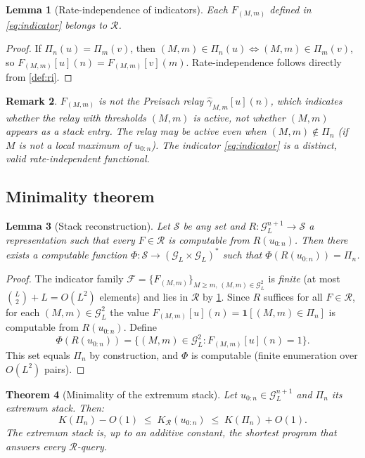 \documentclass[preprint,12pt]{elsarticle}
\newtheorem{theorem}{Theorem}
\newtheorem{lemma}[theorem]{Lemma}
\newtheorem{remark}[theorem]{Remark}
\newcommand{\R}{\mathcal{R}}
\newcommand{\stack}{\Pi}
\newcommand{\GL}{\mathcal{G}_L}
\newcommand{\relay}[2]{\hat{\gamma}_{#1,#2}}
\begin{document}
\begin{lemma}[Rate-independence of indicators]
\label{lem:ri}
Each $F_{(M,m)}$ defined in \eqref{eq:indicator} belongs to $\R$.
\end{lemma}

\begin{proof}
If $\stack_n(u) = \stack_m(v)$, then
$(M,m) \in \stack_n(u) \Leftrightarrow (M,m) \in \stack_m(v)$,
so $F_{(M,m)}[u](n) = F_{(M,m)}[v](m)$.
Rate-independence follows directly from \cref{def:ri}.
\end{proof}

\begin{remark}
$F_{(M,m)}$ is \emph{not} the Preisach relay
$\relay{M}{m}[u](n)$, which indicates whether the relay with
thresholds $(M,m)$ is active, not whether $(M,m)$ appears as a
stack entry.
The relay may be active even when $(M,m) \notin \stack_n$
(if $M$ is not a local maximum of $u_{0:n}$).
The indicator \eqref{eq:indicator} is a distinct, valid
rate-independent functional.
\end{remark}

\subsection{Minimality theorem}

\begin{lemma}[Stack reconstruction]
\label{lem:recon}
Let $\mathcal{S}$ be any set and
$R: \GL^{n+1} \to \mathcal{S}$ a representation such that
every $F \in \R$ is computable from $R(u_{0:n})$.
Then there exists a computable function
$\Phi: \mathcal{S} \to (\GL \times \GL)^*$
such that $\Phi(R(u_{0:n})) = \stack_n$.
\end{lemma}

\begin{proof}
The indicator family $\mathcal{F} = \{F_{(M,m)}\}_{M \geq m,\,
(M,m) \in \GL^2}$ is \emph{finite} (at most
$\binom{L}{2} + L = O(L^2)$ elements) and lies in $\R$
by \cref{lem:ri}.
Since $R$ suffices for all $F \in \R$, for each
$(M,m) \in \GL^2$ the value $F_{(M,m)}[u](n)
= \mathbf{1}[(M,m) \in \stack_n]$ is computable from
$R(u_{0:n})$.
Define
\[
  \Phi(R(u_{0:n}))
  = \bigl\{(M,m) \in \GL^2 : F_{(M,m)}[u](n) = 1\bigr\}.
\]
This set equals $\stack_n$ by construction, and $\Phi$ is
computable (finite enumeration over $O(L^2)$ pairs).
\end{proof}

\begin{theorem}[Minimality of the extremum stack]
\label{thm:main}
Let $u_{0:n} \in \GL^{n+1}$ and $\stack_n$ its extremum stack.
Then:
\begin{equation}
  K(\stack_n) - O(1)
  \;\leq\; K_{\R}(u_{0:n})
  \;\leq\; K(\stack_n) + O(1).
  \label{eq:main}
\end{equation}
The extremum stack is, up to an additive constant, the
shortest program that answers every $\R$-query.
\end{theorem}
\end{document}
